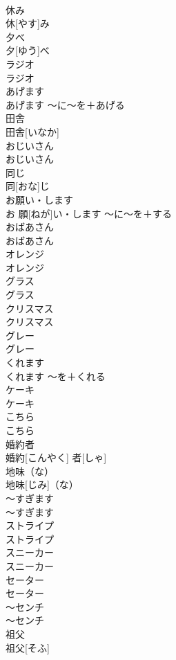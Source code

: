 \documentclass[8pt]{extreport}
\begin{document}
\begin{CJK}{UTF8}{min}
\\	休み	
\\	休[やす]み		
\\	夕べ	
\\	夕[ゆう]べ		
\\	ラジオ	
\\	ラジオ		
\\	あげます	
\\	あげます	〜に〜を＋あげる	
\\	田舎	
\\	田舎[いなか]		
\\	おじいさん	
\\	おじいさん		
\\	同じ	
\\	同[おな]じ		
\\	お願い・します	
\\	お 願[ねが]い・します	〜に〜を＋する	
\\	おばあさん	
\\	おばあさん		
\\	オレンジ	
\\	オレンジ		
\\	グラス	
\\	グラス		
\\	クリスマス	
\\	クリスマス		
\\	グレー	
\\	グレー		
\\	くれます	
\\	くれます	〜を＋くれる	
\\	ケーキ	
\\	ケーキ		
\\	こちら	
\\	こちら		
\\	婚約者	
\\	婚約[こんやく] 者[しゃ]		
\\	地味（な）	
\\	地味[じみ]（な）		
\\	〜すぎます	
\\	〜すぎます		
\\	ストライプ	
\\	ストライプ		
\\	スニーカー	
\\	スニーカー		
\\	セーター	
\\	セーター		
\\	〜センチ	
\\	〜センチ		
\\	祖父	
\\	祖父[そふ]		

\end{CJK}
\end{document}
